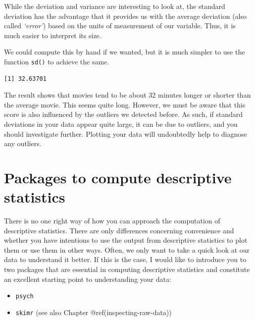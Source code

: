 \documentclass[
  letterpaper,
]{krantz}
\makeatletter
\newenvironment{Shaded}{\begin{snugshade}}{\end{snugshade}}
\newcommand{\FunctionTok}[1]{\textcolor[rgb]{0.28,0.35,0.67}{#1}}
\newcommand{\NormalTok}[1]{\textcolor[rgb]{0.00,0.23,0.31}{#1}}
\newcommand{\SpecialCharTok}[1]{\textcolor[rgb]{0.37,0.37,0.37}{#1}}
\newenvironment{kframe}{%
\medskip{}
\setlength{\fboxsep}{.8em}
 \def\at@end@of@kframe{}%
 \ifinner\ifhmode%
  \def\at@end@of@kframe{\end{minipage}}%
  \begin{minipage}{\columnwidth}%
 \fi\fi%
 \def\FrameCommand##1{\hskip\@totalleftmargin \hskip-\fboxsep
 \colorbox{shadecolor}{##1}\hskip-\fboxsep
     \hskip-\linewidth \hskip-\@totalleftmargin \hskip\columnwidth}%
 \MakeFramed {\advance\hsize-\width
   \@totalleftmargin\z@ \linewidth\hsize
   \@setminipage}}%
 {\par\unskip\endMakeFramed%
 \at@end@of@kframe}
\renewenvironment{Shaded}{\begin{kframe}}{\end{kframe}}
\makeatother
\begin{document}
While the deviation and variance are interesting to look at, the
standard deviation has the advantage that it provides us with the
average deviation (also called \emph{`error'}) based on the units of
measurement of our variable. Thus, it is much easier to interpret its
size.

We could compute this by hand if we wanted, but it is much simpler to
use the function \texttt{sd()} to achieve the same.

\begin{Shaded}
\end{Shaded}

\begin{verbatim}
[1] 32.63701
\end{verbatim}

The result shows that movies tend to be about 32 minutes longer or
shorter than the average movie. This seems quite long. However, we must
be aware that this score is also influenced by the outliers we detected
before. As such, if standard deviations in your data appear quite large,
it can be due to outliers, and you should investigate further. Plotting
your data will undoubtedly help to diagnose any outliers.

\section{Packages to compute descriptive
statistics}\label{packages-for-descriptive-statistics}

There is no one right way of how you can approach the computation of
descriptive statistics. There are only differences concerning
convenience and whether you have intentions to use the output from
descriptive statistics to plot them or use them in other ways. Often, we
only want to take a quick look at our data to understand it better. If
this is the case, I would like to introduce you to two packages that are
essential in computing descriptive statistics and constitute an
excellent starting point to understanding your data:

\begin{itemize}
\item
  \texttt{psych}
\item
  \texttt{skimr} (see also Chapter @ref(inspecting-raw-data))
\end{itemize}
\end{document}
